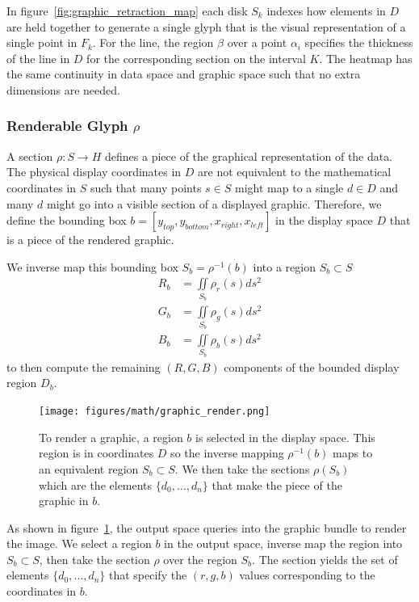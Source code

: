 \documentclass[../main.tex]{subfiles}
\begin{document}
In figure~\ref{fig:graphic_retraction_map} each disk $S_k$ indexes how elements in $D$ are held together to generate a single glyph that is the visual representation of a single point in $F_k$. For the line, the region $\beta$ over a point $\alpha_i$ specifies the thickness of the line in $D$ for the corresponding section on the interval $K$. The heatmap has the same continuity in data space and graphic space such that no extra dimensions are needed. 

 
\subsubsection{Renderable Glyph $\rho$}
\label{sec:graphic_section}

A section $\rho: S\rightarrow H$ defines a piece of the graphical representation of the data. The physical display coordinates in $D$ are not equivalent to the mathematical coordinates in $S$ such that many points $s \in S$ might map to a single $d\in D$ and many $d$ might go into a visible section of a displayed graphic. Therefore, we define the bounding box $b=\left[y_{top}, y_{bottom}, x_{right}, x_{left}\right]$ in the display space $D$ that is a piece of the rendered graphic.  

We inverse map this bounding box $S_b =\rho^{-1}(b)$ into a region $S_b \subset S$  
\begin{align}
    R_b &= \iint\limits_{S_b} \rho_r(s)ds^{2}\\
    G_b &= \iint\limits_{S_b} \rho_g(s)ds^{2}\\
    B_b &= \iint\limits_{S_b} \rho_b(s)ds^{2}
\end{align}
to then compute the remaining $(R, G, B)$ components of the bounded display region $D_b$.

\begin{figure}
    \texttt{[image: figures/math/graphic\_render.png]}
    \caption{To render a graphic, a region $b$ is selected in the display space. This region is in coordinates $D$ so the inverse mapping $\rho^{-1}(b)$ maps to an equivalent region $S_b \subset S$. We then take the sections $\rho(S_b)$ which are the elements $\{d_0, \ldots, d_n\}$ that make the piece of the graphic in $b$.}
    \label{fig:graphic_rho_lookup}
\end{figure}
As shown in figure~\ref{fig:graphic_rho_lookup}, the output space queries into the graphic bundle to render the image. We select a region $b$ in the output space, inverse map the region into $S_b \subset S$, then take the section $\rho$ over the region $S_b$. The section yields the set of elements $\{d_0, \ldots, d_n\}$ that specify the $(r, g, b)$ values corresponding to the coordinates in $b$. 
\end{document}
